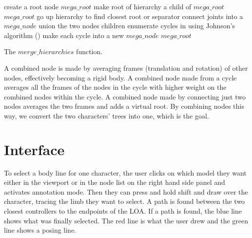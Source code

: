 \begin{algorithm}[H]
 {
  create a root node $mega\_root$\;
  {
   make root of hierarchy a child of $mega\_root$\;
   \Return $mega\_root$\;
  }
 }
 {
  {
   go up hierarchy to find closest root or separator\;
   {
    connect joints into a $mega\_node$\;
    union the two nodes children\;
   }
  }
 }
 enumerate cycles in using Johnson's algorithm (\citep{johnson1975finding})\;
 make each cycle into a new $mega\_node$\;
 \Return $mega\_root$\;
 
 \caption{The $merge\_hierarchies$ function.}
\end{algorithm}

A combined node is made by averaging frames (translation and rotation) of other nodes, effectively becoming a rigid body. A combined node made from a cycle averages all the frames of the nodes in the cycle with higher weight on the combined nodes within the cycle. A combined node made by connecting just two nodes averages the two frames and adds a virtual root. By combining nodes this way, we convert the two characters' trees into one, which is the goal.

\section{Interface}
To select a body line for one character, the user clicks on which model they want either in the viewport or in the node list on the right hand side panel and activates annotation mode. Then they can press and hold shift and draw over the character, tracing the limb they want to select. A path is found between the two closest controllers to the endpoints of the LOA. If a path is found, the blue line shows what was finally selected. The red line is what the user drew and the green line shows a posing line.

